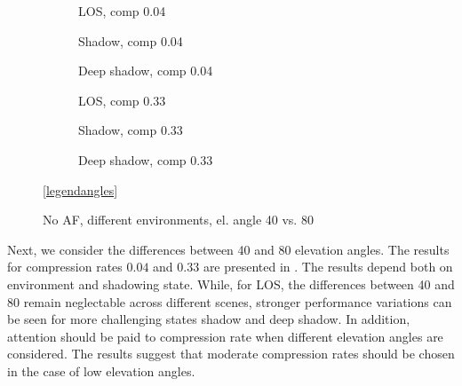 \documentclass[conference]{IEEEtran}
\begin{document}
\begin{figure}[t!]
  \begin{subfigure}{.32\linewidth}
  \centering
  
  \caption{LOS, comp 0.04}
\end{subfigure}
\hfill
\begin{subfigure}{.32\linewidth}
  \centering
  
  \caption{Shadow, comp 0.04}
\end{subfigure}
\hfill
\begin{subfigure}{.32\linewidth}
  \centering
  
  \caption{Deep shadow, comp 0.04}
\end{subfigure}

\vspace{1em}

\begin{subfigure}{.32\linewidth}
  \centering
  
  \caption{LOS, comp 0.33}
\end{subfigure}
\hfill
\begin{subfigure}{.32\linewidth}
  \centering
  
  \caption{Shadow, comp 0.33}
\end{subfigure}
\hfill
\begin{subfigure}{.32\linewidth}
  \centering
  
  \caption{Deep shadow, comp 0.33}
\end{subfigure}

\vspace{1em}
\centering
\ref{legendangles}

\caption{No AF, different environments, el. angle 40 vs. 80}
\label{fig:elevation_angles}
\end{figure}


Next, we consider the differences between 40 and 80 elevation angles. 
The results for compression rates $0.04$ and $0.33$ are presented in .
The results depend both on environment and shadowing state.
While, for LOS, the differences between 40 and 80 remain neglectable across different scenes, 
stronger performance variations can be seen for more challenging states shadow and deep shadow.
In addition, attention should be paid to compression rate when different elevation angles are considered. 
The results suggest that moderate compression rates should be chosen in the case of low elevation angles.
\end{document}
